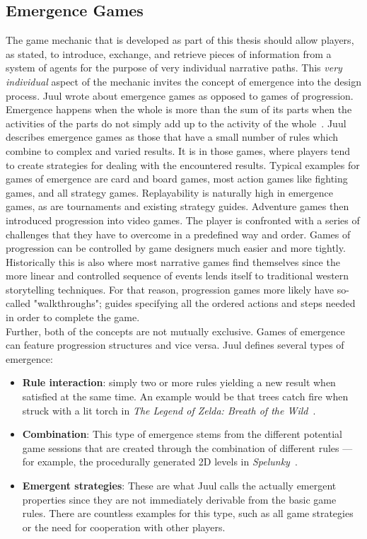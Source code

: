 \subsection{Emergence Games}
The game mechanic that is developed as part of this thesis should allow players, as stated, to introduce, exchange, and retrieve pieces of information from a system of agents for the purpose of very individual narrative paths. This \textit{very individual} aspect of the mechanic invites the concept of emergence into the design process. Juul wrote about emergence games as opposed to games of progression.\\
Emergence happens when the whole is more than the sum of its parts when the activities of the parts do not simply add up to the activity of the whole~\cite{Holland2000}. Juul describes emergence games as those that have a small number of rules which combine to complex and varied results. It is in those games, where players tend to create strategies for dealing with the encountered results. Typical examples for games of emergence are card and board games, most action games like fighting games, and all strategy games. Replayability is naturally high in emergence games, as are tournaments and existing strategy guides. Adventure games then introduced progression into video games. The player is confronted with a series of challenges that they have to overcome in a predefined way and order. Games of progression can be controlled by game designers much easier and more tightly. Historically this is also where most narrative games find themselves since the more linear and controlled sequence of events lends itself to traditional western storytelling techniques. For that reason, progression games more likely have so-called "walkthroughs"; guides specifying all the ordered actions and steps needed in order to complete the game.~\cite{Juul2002}\\
Further, both of the concepts are not mutually exclusive. Games of emergence can feature progression structures and vice versa. Juul defines several types of emergence:
\begin{itemize}
	\item \textbf{Rule interaction}: simply two or more rules yielding a new result when satisfied at the same time. An example would be that trees catch fire when struck with a lit torch in \textit{The Legend of Zelda: Breath of the Wild}~\cite{zeldabotw}.
	\item \textbf{Combination}: This type of emergence stems from the different potential game sessions that are created through the combination of different rules — for example, the procedurally generated 2D levels in \textit{Spelunky}~\cite{spelunky}.
	\item \textbf{Emergent strategies}: These are what Juul calls the actually emergent properties since they are not immediately derivable from the basic game rules. There are countless examples for this type, such as all game strategies or the need for cooperation with other players.
\end{itemize} 
